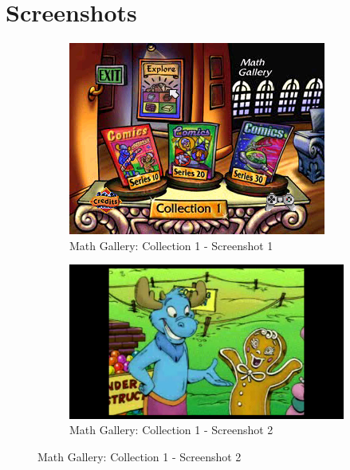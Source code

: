 \clearpage
\newpage

\section{Screenshots}

\begin{figure}[H]
    \centering
    \begin{subfigure}{0.45\textwidth}
        \centering
        \includegraphics[width=\linewidth]{Games/MathGalleryCollection/Images/MathGalleryCollection1Image1.png}
        \caption{Math Gallery: Collection 1 - Screenshot 1}
    \end{subfigure}
    \begin{subfigure}{0.45\textwidth}
        \includegraphics[width=\linewidth]{Games/MathGalleryCollection/Images/MathGalleryCollection1Image2.png}
        \caption{Math Gallery: Collection 1 - Screenshot 2}
    \end{subfigure}


\end{figure}

